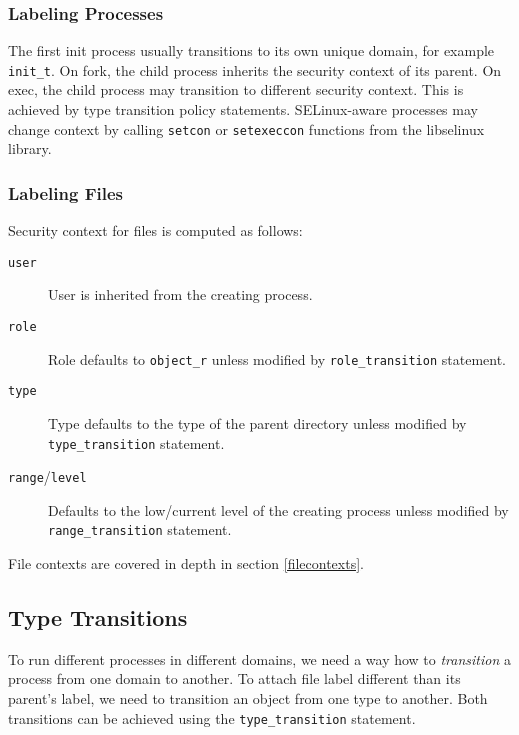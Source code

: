 \subsubsection{Labeling Processes}
The first init process usually transitions to its own unique domain, for example
\texttt{init\_t}. On fork, the child process inherits the security context of
its parent. On exec, the child process may transition to different security
context. This is achieved by type transition policy statements. SELinux-aware
processes may change context by calling \texttt{setcon} or \texttt{setexeccon}
functions from the libselinux library.

\subsubsection{Labeling Files}
Security context for files is computed as follows:
\begin{description}
    \item [\texttt{user}] User is inherited from the creating process.
    \item [\texttt{role}] Role defaults to \texttt{object\_r} unless modified by
        \texttt{role\_transition} statement.
    \item [\texttt{type}] Type defaults to the type of the parent directory
        unless modified by \texttt{type\_transition} statement.
    \item [\texttt{range}/\texttt{level}] Defaults to the low/current level of
        the creating process unless modified by \texttt{range\_transition}
        statement.
\end{description}
File contexts are covered in depth in section \ref{filecontexts}.

\subsection{Type Transitions}
\label{typetransitions}
To run different processes in different domains, we need a way how to
\emph{transition} a process from one domain to another. To attach file label
different than its parent's label, we need to transition an object from one type
to another. Both transitions can be achieved using the \texttt{type\_transition}
statement.

